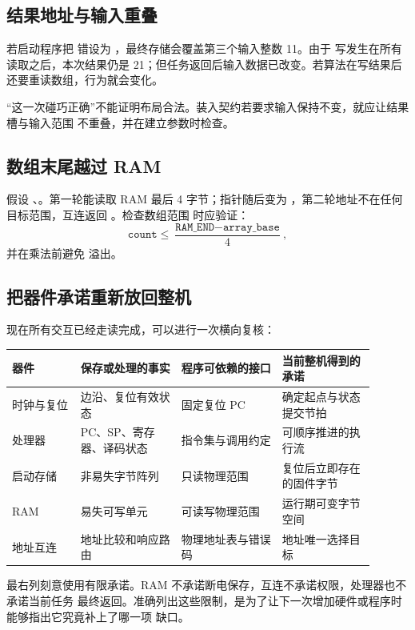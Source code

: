 \subsection{结果地址与输入重叠}

若启动程序把  错设为 ，最终存储会覆盖第三个输入整数 11。由于
写发生在所有读取之后，本次结果仍是 21；但任务返回后输入数据已改变。若算法在写结果后
还要重读数组，行为就会变化。

“这一次碰巧正确”不能证明布局合法。装入契约若要求输入保持不变，就应让结果槽与输入范围
不重叠，并在建立参数时检查。

\subsection{数组末尾越过 RAM}

假设 、。第一轮能读取 RAM 最后 4 字节；指针随后变为
，第二轮地址不在任何目标范围，互连返回 。检查数组范围
时应验证：
\[
\texttt{count}\le
\frac{\texttt{RAM\_END}-\texttt{array\_base}}{4},
\]
并在乘法前避免  溢出。

\subsection{把器件承诺重新放回整机}

现在所有交互已经走读完成，可以进行一次横向复核：

\begin{longtable}{|L{0.17\linewidth}|L{0.25\linewidth}|L{0.25\linewidth}|L{0.23\linewidth}|}
\hline
{}
器件 & 保存或处理的事实 & 程序可依赖的接口 & 当前整机得到的承诺 \\ \hline
时钟与复位 & 边沿、复位有效状态 & 固定复位 PC & 确定起点与状态提交节拍 \\ \hline
处理器 & PC、SP、寄存器、译码状态 & 指令集与调用约定 & 可顺序推进的执行流 \\ \hline
启动存储 & 非易失字节阵列 & 只读物理范围 & 复位后立即存在的固件字节 \\ \hline
RAM & 易失可写单元 & 可读写物理范围 & 运行期可变字节空间 \\ \hline
地址互连 & 地址比较和响应路由 & 物理地址表与错误码 & 地址唯一选择目标 \\ \hline
\end{longtable}

最右列刻意使用有限承诺。RAM 不承诺断电保存，互连不承诺权限，处理器也不承诺当前任务
最终返回。准确列出这些限制，是为了让下一次增加硬件或程序时能够指出它究竟补上了哪一项
缺口。

